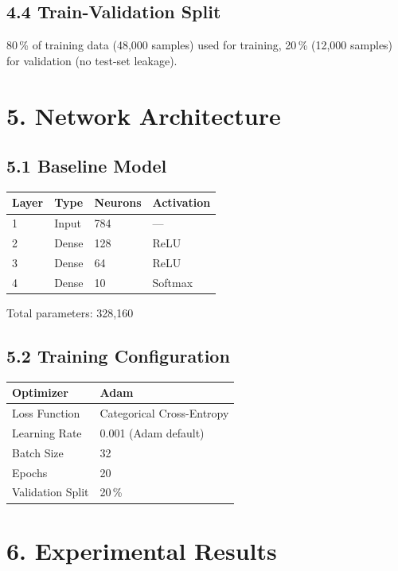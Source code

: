 \documentclass[11pt]{article}
\begin{document}
\subsection*{4.4 Train-Validation Split}
80\,\% of training data (48,000 samples) used for training, 20\,\% (12,000 samples) for validation (no test-set leakage).

\section*{5. Network Architecture}

\subsection*{5.1 Baseline Model}
\begin{center}
\begin{tabular}{|l|l|l|l|}
\hline
\textbf{Layer} & \textbf{Type} & \textbf{Neurons} & \textbf{Activation}\\
\hline
1 & Input & 784 & ---\\
\hline
2 & Dense & 128 & ReLU\\
\hline
3 & Dense & 64 & ReLU\\
\hline
4 & Dense & 10 & Softmax\\
\hline
\end{tabular}
\end{center}

Total parameters: 328,160

\subsection*{5.2 Training Configuration}
\begin{center}
\begin{tabular}{|l|l|}
\hline
Optimizer & Adam\\
\hline
Loss Function & Categorical Cross-Entropy\\
\hline
Learning Rate & 0.001 (Adam default)\\
\hline
Batch Size & 32\\
\hline
Epochs & 20\\
\hline
Validation Split & 20\,\%\\
\hline
\end{tabular}
\end{center}

\section*{6. Experimental Results}
\end{document}
